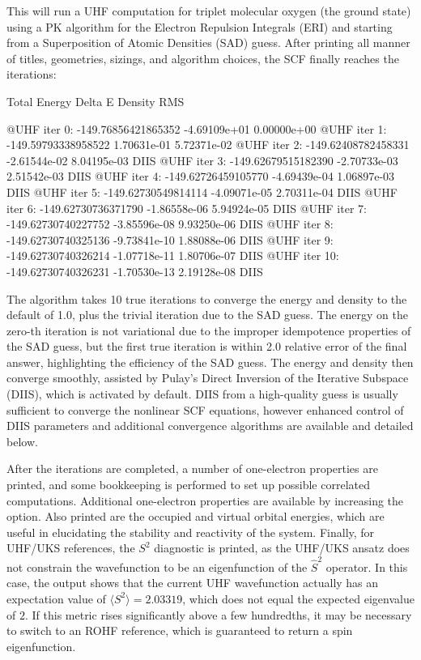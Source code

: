 This will run a UHF computation for triplet molecular oxygen (the ground state)
using a PK algorithm for the Electron Repulsion Integrals (ERI) and starting
from a Superposition of Atomic Densities (SAD) guess. After printing all manner
of titles, geometries, sizings, and algorithm choices, the SCF finally reaches
the iterations:
\begin{Snippet}
                        Total Energy        Delta E     Density RMS

   @UHF iter   0:  -149.76856421865352   -4.69109e+01   0.00000e+00
   @UHF iter   1:  -149.59793338958522    1.70631e-01   5.72371e-02
   @UHF iter   2:  -149.62408782458331   -2.61544e-02   8.04195e-03 DIIS
   @UHF iter   3:  -149.62679515182390   -2.70733e-03   2.51542e-03 DIIS
   @UHF iter   4:  -149.62726459105770   -4.69439e-04   1.06897e-03 DIIS
   @UHF iter   5:  -149.62730549814114   -4.09071e-05   2.70311e-04 DIIS
   @UHF iter   6:  -149.62730736371790   -1.86558e-06   5.94924e-05 DIIS
   @UHF iter   7:  -149.62730740227752   -3.85596e-08   9.93250e-06 DIIS
   @UHF iter   8:  -149.62730740325136   -9.73841e-10   1.88088e-06 DIIS
   @UHF iter   9:  -149.62730740326214   -1.07718e-11   1.80706e-07 DIIS
   @UHF iter  10:  -149.62730740326231   -1.70530e-13   2.19128e-08 DIIS
\end{Snippet}
The algorithm takes 10 true iterations to converge the energy and density to the
default of 1.0, plus the trivial iteration due to the SAD guess.
The energy on the zero-th iteration is not variational due to the improper
idempotence properties of the SAD guess, but the first true iteration is within
2.0 relative error of the final answer, highlighting the
efficiency of the SAD guess. The energy and density then converge smoothly,
assisted by Pulay's Direct Inversion of the Iterative Subspace (DIIS), which is
activated by default. DIIS from a high-quality guess is usually sufficient to
converge the nonlinear SCF equations, however enhanced control of DIIS
parameters and additional convergence algorithms are available and detailed
below. 

After the iterations are completed, a number of one-electron properties are
printed, and some bookkeeping is performed to set up possible correlated
computations. Additional one-electron properties are available by increasing the
 option. Also printed are the occupied and virtual orbital
energies, which are useful in elucidating the stability and reactivity of the
system. Finally, for UHF/UKS references, the $S^2$ diagnostic is printed, as the
UHF/UKS ansatz does not constrain the wavefunction to be an eigenfunction of the
$\hat S^2$ operator. In this case, the output shows that the current UHF
wavefunction actually has an expectation value of $\langle S^2\rangle = 2.03319$, which does
not equal the expected eigenvalue of $2$.  If this metric rises significantly
above a few hundredths, it may be necessary to switch to an ROHF reference,
which is guaranteed to return a spin eigenfunction. 
  
